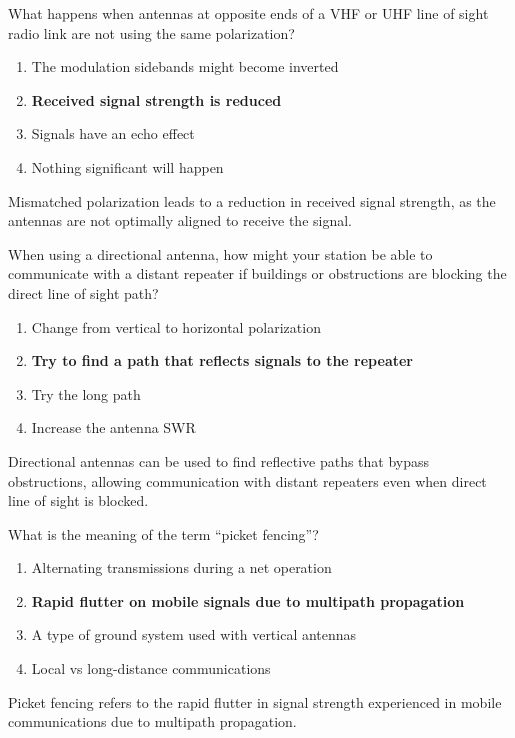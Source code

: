 \begin{tcolorbox}[colback=gray!10!white,colframe=black!75!black,title={T3A04}]
    What happens when antennas at opposite ends of a VHF or UHF line of sight radio link are not using the same polarization?
    \begin{enumerate}[label=\Alph*),noitemsep]
        \item The modulation sidebands might become inverted
        \item \textbf{Received signal strength is reduced}
        \item Signals have an echo effect
        \item Nothing significant will happen
    \end{enumerate}
\end{tcolorbox}
Mismatched polarization leads to a reduction in received signal strength, as the antennas are not optimally aligned to receive the signal.

\begin{tcolorbox}[colback=gray!10!white,colframe=black!75!black,title={T3A05}]
    When using a directional antenna, how might your station be able to communicate with a distant repeater if buildings or obstructions are blocking the direct line of sight path?
    \begin{enumerate}[label=\Alph*),noitemsep]
        \item Change from vertical to horizontal polarization
        \item \textbf{Try to find a path that reflects signals to the repeater}
        \item Try the long path
        \item Increase the antenna SWR
    \end{enumerate}
\end{tcolorbox}
Directional antennas can be used to find reflective paths that bypass obstructions, allowing communication with distant repeaters even when direct line of sight is blocked.

\begin{tcolorbox}[colback=gray!10!white,colframe=black!75!black,title={T3A06}]
    What is the meaning of the term “picket fencing”?
    \begin{enumerate}[label=\Alph*),noitemsep]
        \item Alternating transmissions during a net operation
        \item \textbf{Rapid flutter on mobile signals due to multipath propagation}
        \item A type of ground system used with vertical antennas
        \item Local vs long-distance communications
    \end{enumerate}
\end{tcolorbox}
Picket fencing refers to the rapid flutter in signal strength experienced in mobile communications due to multipath propagation.

